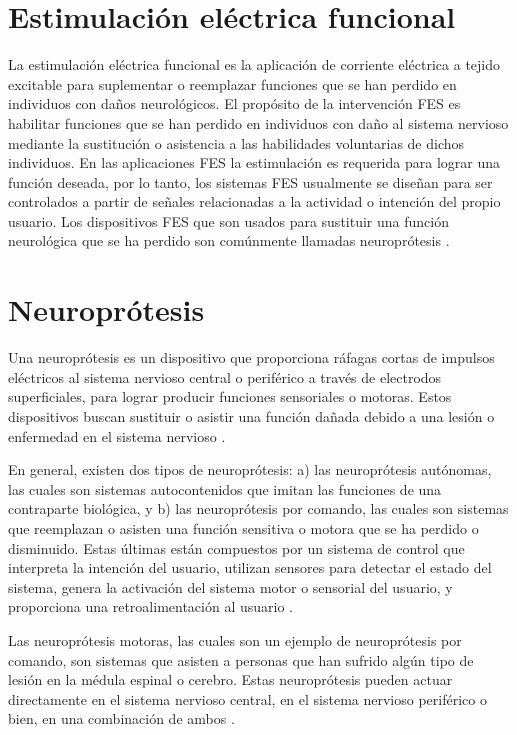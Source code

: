 
\section{Estimulación eléctrica funcional}
La estimulación eléctrica funcional es la aplicación de corriente eléctrica a tejido excitable para suplementar o reemplazar funciones que se han perdido en individuos con daños neurológicos. El propósito de la intervención FES es habilitar funciones que se han perdido en individuos con daño al sistema nervioso mediante la sustitución o asistencia a las habilidades voluntarias de dichos individuos. En las aplicaciones FES la estimulación es requerida para lograr una función deseada, por lo tanto, los sistemas FES usualmente se diseñan para ser controlados a partir de señales relacionadas a la actividad o intención del propio usuario. Los dispositivos FES que son usados para sustituir una función neurológica que se ha perdido son comúnmente llamadas neuroprótesis \cite{Peckham2005}.

\section{Neuroprótesis}
Una neuroprótesis es un dispositivo que proporciona ráfagas cortas de impulsos eléctricos al sistema nervioso central o periférico a través de electrodos superficiales, para lograr producir funciones sensoriales o motoras. Estos dispositivos buscan sustituir o asistir una función dañada debido a una lesión o enfermedad en el sistema nervioso \cite{Popovic2008}\cite{Popovic2015}.

En general, existen dos tipos de neuroprótesis: a) las neuroprótesis autónomas, las cuales son sistemas autocontenidos que imitan las funciones de una contraparte biológica, y b) las neuroprótesis por comando, las cuales son sistemas que reemplazan o asisten una función sensitiva o motora que se ha perdido o disminuido. Estas últimas están compuestos por un sistema de control que interpreta la intención del usuario, utilizan sensores para detectar el estado del sistema, genera la activación del sistema motor o sensorial del usuario, y proporciona una retroalimentación al usuario \cite{Popovic2015}.

Las neuroprótesis motoras, las cuales son un ejemplo de neuroprótesis por comando, son sistemas que asisten a personas que han sufrido algún tipo de lesión en la médula espinal o cerebro. Estas neuroprótesis pueden actuar directamente en el sistema nervioso central, en el sistema nervioso periférico o bien, en una combinación de ambos \cite{Popovic2015}.

